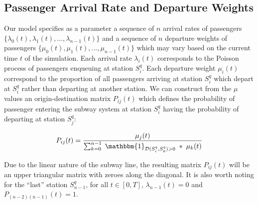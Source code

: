 \documentclass[12pt]{article}
\begin{document}
\hfill \newline


\subsection{Passenger Arrival Rate and Departure Weights}

Our model specifies as a parameter a sequence of $n$ arrival rates of passengers $\{ \lambda_0(t), \lambda_1(t), ... , \lambda_{n-1}(t) \}$ and a sequence of $n$ departure weights of passengers $\{ \mu_0(t), \mu_1(t), ... , \mu_{n-1}(t) \}$ which may vary based on the current time $t$ of the simulation.
Each arrival rate $\lambda_i(t)$ corresponds to the Poisson process of passengers enqueuing at station $S_i^q$.
Each departure weight $\mu_i(t)$ correspond to the proportion of all passengers arriving at station $S_i^q$ which depart at $S_i^q$ rather than departing at another station.
We can construct from the $\mu$ values an origin-destination matrix $P_{ij}(t)$ which defines the probability of passenger entering the subway system at station $S_i^q$ having the probability of departing at station $S_j^q$:

\[ P_{ij}(t) = \frac{\mu_j(t)}{\sum_{k=0}^{n-1} \;\mathbbm{1}_{\mathcal{D}(S_i^q, S_k^q) > 0}\; * \; \mu_k(t)} \]

Due to the linear nature of the subway line, the resulting matrix $P_{ij}(t)$ will be an upper triangular matrix with zeroes along the diagonal. It is also worth noting for the ``last'' station $S_{n-1}^q$, for all $t \in [0, T]$, $\lambda_{n-1}(t) = 0$ and $P_{(n-2)(n-1)}(t) = 1$. 
\end{document}
